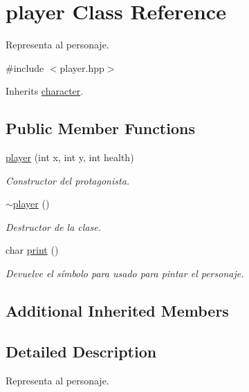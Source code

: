 \hypertarget{classplayer}{\section{player Class Reference}
\label{classplayer}
}


Representa al personaje.  




{\ttfamily \#include $<$player.\-hpp$>$}



Inherits \hyperlink{classcharacter}{character}.

\subsection*{Public Member Functions}
\begin{DoxyCompactItemize}
\item 
\hyperlink{classplayer_a6dbe9518683d3c4d66c63d1348d68395}{player} (int x, int y, int health)
\begin{DoxyCompactList}\small\item\em Constructor del protagonista. \end{DoxyCompactList}\item 
\hypertarget{classplayer_aab5d2e47b80e0481f09ca0df8b823057}{\hyperlink{classplayer_aab5d2e47b80e0481f09ca0df8b823057}{$\sim$player} ()}\label{classplayer_aab5d2e47b80e0481f09ca0df8b823057}

\begin{DoxyCompactList}\small\item\em Destructor de la clase. \end{DoxyCompactList}\item 
char \hyperlink{classplayer_aaa63ac3873ca271961e3df1a1fea7370}{print} ()
\begin{DoxyCompactList}\small\item\em Devuelve el símbolo para usado para pintar el personaje. \end{DoxyCompactList}\end{DoxyCompactItemize}
\subsection*{Additional Inherited Members}


\subsection{Detailed Description}
Representa al personaje. 

